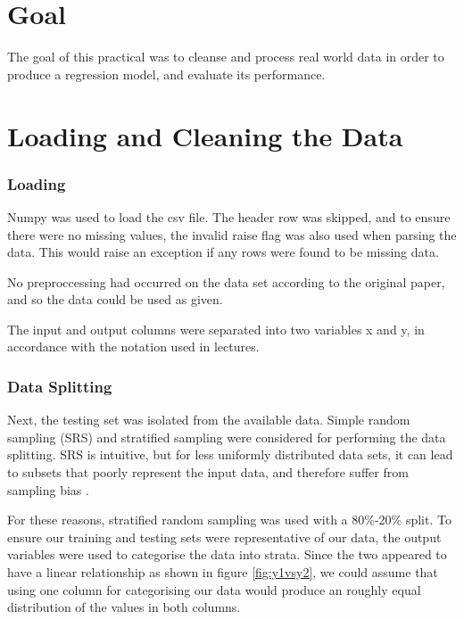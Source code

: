 \documentclass[12pt]{article}
\begin{document}

\part*{Goal}

The goal of this practical was to cleanse and process real world data in order to produce a regression model, and evaluate its performance.

\tableofcontents

\pagebreak

\setcounter{page}{1}

\part{Loading and Cleaning the Data}

\section{Loading}
Numpy was used to load the csv file. The header row was skipped, and to ensure there were no missing values, the invalid raise flag was also used when parsing the data. This would raise an exception if any rows were found to be missing data. 

No preproccessing had occurred on the data set according to the original paper, and so the data could be used as given.

The input and output columns were separated into two variables x and y, in accordance with the notation used in lectures.

\section{Data Splitting}

Next, the testing set was isolated from the available data. Simple random sampling (SRS) and stratified sampling were considered for performing the data splitting. SRS is intuitive, but for less uniformly distributed data sets, it can lead to subsets that poorly represent the input data, and therefore suffer from sampling bias \cite{reitermanova_2010}. 

For these reasons, stratified random sampling was used with a 80\%-20\% split.  To ensure our training and testing sets were representative of our data, the output variables were used to categorise the data into strata. Since the two appeared to have a linear relationship as shown in figure \ref{fig:y1vsy2}, we could assume that using one column for categorising our data would produce an roughly equal distribution of the values in both columns.
\end{document}
